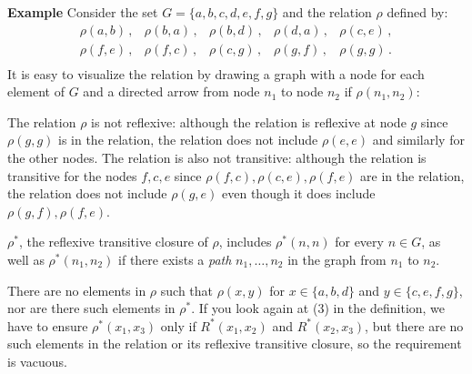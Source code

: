 \documentclass[12pt,a4paper]{article}
\newenvironment{example}{\textbf{Example}}{}
\begin{document}
\begin{example}
Consider the set $G=\{a,b,c,d,e,f,g\}$ and the relation $\rho$ defined by:
\[
\begin{array}{llllll}
\rho(a,b)\,, & \rho(b,a)\,, & \rho(b,d)\,, & \rho(d,a)\,,& \rho(c,e)\,,\\
\rho(f,e)\,,&\rho(f,c)\,,&\rho(c,g)\,,&\rho(g,f)\,,&\rho(g,g)\,.\\
\end{array}
\]
It is easy to visualize the relation by drawing a graph with a node for each element of $G$ and a directed arrow from node $n_1$ to node $n_2$ if $\rho(n_1,n_2)$:
\begin{center}
\end{center}
The relation $\rho$ is not reflexive: although the relation is reflexive at node $g$ since $\rho(g,g)$ is in the relation, the relation does not include $\rho(e,e)$ and similarly for the other nodes. The relation is also not transitive: although the relation is transitive for the nodes $f,c,e$ since $\rho(f,c), \rho(c,e), \rho(f,e)$ are in the relation, the relation does not include $\rho(g,e)$ even though it does include $\rho(g,f),\rho(f,e)$.

$\rho^{*}$, the reflexive transitive closure of $\rho$, includes $\rho^{*}(n,n)$ for every $n\in G$, as well as $\rho^{*}(n_1,n_2)$ if there exists a \emph{path} $n_1,\ldots,n_2$ in the graph from $n_1$ to $n_2$.

There are no elements in $\rho$ such that $\rho(x,y)$ for $x\in \{a,b,d\}$ and $y\in\{c,e,f,g\}$, nor are there such elements in $\rho^{*}$. If you look again at (3) in the definition, we have to ensure $\rho^{*}(x_1,x_3)$ only if $R^{*}(x_{1},x_{2})$ and $R^{*}(x_{2},x_{3})$, but there are no such elements in the relation or its reflexive transitive closure, so the requirement is vacuous.
\end{example}
\end{document}
